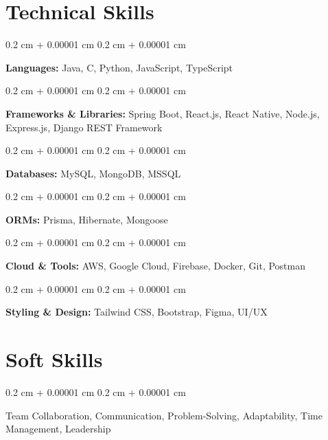 \documentclass[10pt, letterpaper]{article}
\newenvironment{onecolentry}{
	\begin{adjustwidth}{
		0.2 cm + 0.00001 cm
	}{
		0.2 cm + 0.00001 cm
	}
	}{
	\end{adjustwidth}
} %
\begin{document}
	\section{Technical Skills}
	\begin{onecolentry}
		\textbf{Languages:} Java, C, Python, JavaScript, TypeScript
	\end{onecolentry}
	\vspace{0.20 cm}
	\begin{onecolentry}
		\textbf{Frameworks \& Libraries:} Spring Boot, React.js, React Native, Node.js, Express.js, Django REST Framework
	\end{onecolentry}
	\vspace{0.20 cm}
	\begin{onecolentry}
		\textbf{Databases:} MySQL, MongoDB, MSSQL
	\end{onecolentry}
	\vspace{0.20 cm}
	\begin{onecolentry}
		\textbf{ORMs:} Prisma, Hibernate, Mongoose
	\end{onecolentry}
	\vspace{0.20 cm}
	\begin{onecolentry}
		\textbf{Cloud \& Tools:} AWS, Google Cloud, Firebase, Docker, Git, Postman
	\end{onecolentry}
	\vspace{0.20 cm}
	\begin{onecolentry}
		\textbf{Styling \& Design:} Tailwind CSS, Bootstrap, Figma, UI/UX
	\end{onecolentry}

	\section{Soft Skills}
	\begin{onecolentry}
		Team Collaboration,  Communication,  Problem-Solving,  Adaptability,  Time Management,  Leadership
	\end{onecolentry}

\end{document}
